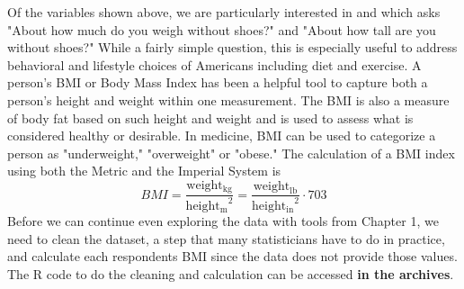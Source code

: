 Of the variables shown above, we are particularly interested in  and  which asks "About how much do you weigh without shoes?" and "About how tall are you without shoes?" While a fairly simple question, this is especially useful to address behavioral and lifestyle choices of Americans including diet and exercise. A person's BMI or Body Mass Index has been a helpful tool to capture both a person's height and weight within one measurement. The BMI is also a measure of body fat based on such height and weight and is used to assess what is considered healthy or desirable. In medicine, BMI can be used to categorize a person as "underweight," "overweight" or "obese." The calculation of a BMI index using both the Metric and the Imperial System is \[BMI=\frac{\mathrm{weight_{kg}}}{\mathrm{height_{m}}^2}=\frac{\mathrm{weight_{lb}}}{\mathrm{height_{in}}^2}\cdot 703\]
Before we can continue even exploring the data with tools from Chapter 1, we need to clean the dataset, a step that many statisticians have to do in practice, and calculate each respondents BMI since the  data does not provide those values. The R code to do the cleaning and calculation can be accessed \textbf{in the archives}. 

